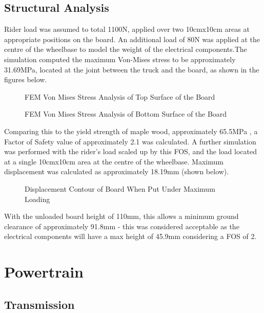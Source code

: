 \documentclass[journal,10pt]{IEEEtran}
\begin{document}
    \subsection{Structural Analysis}
        Rider load was assumed to total 1100N, applied over two 10cmx10cm areas at appropriate positions on the board. An additional load of 80N was applied at the centre of the wheelbase to model the weight of the electrical components.The simulation computed the maximum Von-Mises stress to be approximately 31.69MPa, located at the joint between the truck and the board, as shown in the figures below.
        \begin{figure}[H]
            \centering
            \caption{FEM Von Mises Stress Analysis of Top Surface of the Board
            }
            \label{fig:stressTop}
        \end{figure}
        \begin{figure}[H]
            \centering
            \caption{FEM Von Mises Stress Analysis of Bottom Surface of the Board
            }
            \label{fig:stressBottom}
        \end{figure}
        Comparing this to the yield strength of maple wood, approximately 65.5MPa \cite{materialProperties}, a Factor of Safety value of approximately 2.1 was calculated. A further simulation was performed with the rider's load scaled up by this FOS, and the load located at a single 10cmx10cm area at the centre of the wheelbase. Maximum displacement was calculated as approximately 18.19mm (shown below). 
        \begin{figure}[H]
                \centering
                \caption{Displacement Contour of Board When Put Under Maximum Loading
                }
                \label{fig:Displacement}
            \end{figure}
        With the unloaded board height of 110mm, this allows a minimum ground clearance of approximately 91.8mm - this was considered acceptable as the electrical components will have a max height of 45.9mm considering a FOS of 2.
    
\section{Powertrain}
    \subsection{Transmission}
\end{document}
